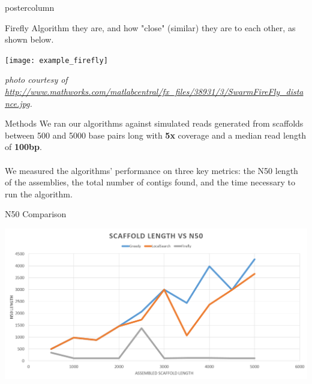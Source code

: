 \documentclass[final,hyperref={pdfpagelabels=false}]{beamer}
\begin{document}
\begin{frame}
\begin{columns}
\begin{column}{.32\textwidth}
\begin{beamercolorbox}[center,wd=\textwidth]{postercolumn}
\begin{minipage}[T]{.95\textwidth}
{\begin{block}{Firefly Algorithm}
                            they are, and how "close" (similar) they are to
                            each other, as shown below.
                            \begin{center}
                                \texttt{[image: example\_firefly]}
                            \end{center}
                            {\em {\small photo courtesy of \url{http://www.mathworks.com/matlabcentral/fx_files/38931/3/SwarmFireFly_distance.jpg}. } }
                        \end{block}
                        \begin{block}{Methods}
                            We ran our algorithms against simulated reads
                            generated from scaffolds between 500 and 5000 base
                            pairs long with {\bf 5x} coverage and a median read
                            length of {\bf 100bp}. \\ \\
                            We measured the algorithms' performance on three
                            key metrics: the N50 length of the assemblies, the
                            total number of contigs found, and the time
                            necessary to run the algorithm.
                        \end{block}
                        \begin{block}{N50 Comparison}
                            \begin{center}
                                \includegraphics[scale=0.66]{n50_poster}
                            \end{center}
                        \end{block}
                    }
        \end{minipage}
    \end{beamercolorbox}

\end{column}
\end{columns}
\end{frame}
\end{document}

